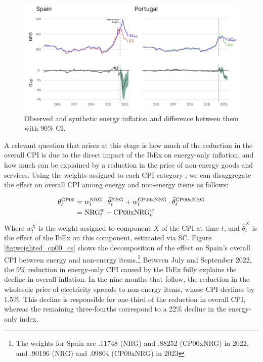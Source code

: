 \documentclass[12pt,a4paper]{article}
\begin{document}
\begin{figure}[!h]
    \centering 
    \includegraphics[width = .9\linewidth]{NRG_12_independent_y.png}
    \caption{Observed and synthetic energy inflation and difference between them with 90\% CI.}
    \label{fig:result_nrg}
\end{figure}
A relevant question that arises at this stage is how much of the reduction in the overall CPI is due to the direct impact of the IbEx on energy-only inflation, and how much can be explained by a reduction in the price of non-energy goods and services. Using the weights assigned to each CPI category \parencite{eurostat2023a}, we can disaggregate the effect on overall CPI among energy and non-energy items as follows:\par
\begin{align*}
\theta_{t}^{\mbox{\scriptsize{CP00}}}&=w_{t}^{\mbox{\scriptsize{NRG}}}\cdot\widehat{\theta}_{t}^{\mbox{\scriptsize{NRG}}}+w_{t}^{\mbox{\scriptsize{CP00xNRG}}}\cdot\widehat{\theta}_{t}^{\mbox{\scriptsize{CP00xNRG}}}\\
&=\mbox{NRG}_{t}^{w}+\mbox{CP00xNRG}_{t}^{w}
\end{align*}
Where $w_{t}^{X}$ is the weight assigned to component $X$ of the CPI at time $t$, and $\widehat{\theta}_{t}^{X}$ is the effect of the IbEx on this component, estimated via SC. Figure \ref{fig:weighted_cp00_es} shows the decomposition of the effect on Spain’s overall CPI between energy and non-energy items.\footnote{The weights for Spain are .11748 (NRG) and .88252 (CP00xNRG) in 2022, and .90196 (NRG) and .09804 (CP00xNRG) in 2023} Between July and September 2022, the 9\% reduction in energy-only CPI caused by the IbEx fully explains the decline in overall inflation. In the nine months that follow, the reduction in the wholesale price of electricity spreads to non-energy items, whose CPI declines by 1.5\%. This decline is responsible for one-third of the reduction in overall CPI, whereas the remaining three-fourths correspond to a 22\% decline in the energy-only index.\par
\end{document}
